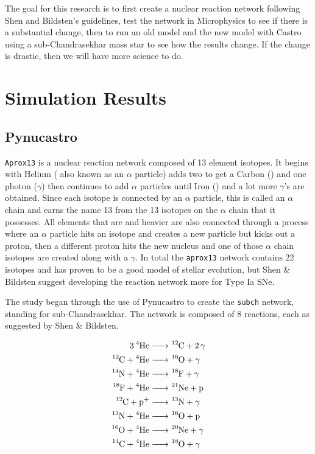\documentclass[11pt, oneside]{article}   	%
\begin{document}
  The goal for this research is to first create a nuclear reaction network following Shen and Bildsten's guidelines, test the network in Microphysics to see if there is a substantial change, then to run an old model and the new model with Castro using a sub-Chandrasekhar mass star to see how the results change. If the change is drastic, then we will have more science to do. 
  
\section{Simulation Results}

  \subsection{Pynucastro}
    
    {\tt Aprox13} is a nuclear reaction network composed of 13 element isotopes. It begins with Helium ( also known as an $\alpha$ particle) adds two  to get a Carbon () and one photon ($\gamma$) then continues to add $\alpha$ particles until Iron () and a lot more $\gamma$'s are obtained. Since each isotope is connected by an $\alpha$ particle, this is called an $\alpha$ chain and earns the name 13 from the 13 isotopes on the $\alpha$ chain that it possesses. All elements that are  and heavier are also connected through a process where an $\alpha$ particle hits an isotope and creates a new particle but kicks out a proton, then a different proton hits the new nucleus and one of those $\alpha$ chain isotopes are created along with a $\gamma$. In total the {\tt aprox13} network contains 22 isotopes and has proven to be a good model of stellar evolution, but Shen \& Bildsten suggest developing the reaction network more for Type Ia SNe. %
    
    The study began through the use of Pynucastro to create the {\tt subch} network, standing for sub-Chandrasekhar. The network is composed of 8 reactions, each as suggested by Shen \& Bildsten. %
    
    \begin{align}
            \ce{3 ^4He &->  ^{12}C + 2\gamma } \\ 
            \ce{^{12}C + ^4He &->  ^{16}O + \gamma } \\
            \ce{^{14}N + ^4He &->  ^{18}F + \gamma } \label{chemeq:1.1} \\
            \ce{^{18}F + ^4He &-> ^{21}Ne +  \text{p}} \label{chemeq:1.2} \\
            \ce{^{12}C + p+ &-> ^{13}N + \gamma } \label{chemeq:2.1} \\
            \ce{^{13}N + ^4He &-> ^{16}O + \text{p}} \label{chemeq:2.2} \\ 
            \ce{^{16}O + ^4He &-> ^{20}Ne + \gamma } \\
            \ce{^{14}C + ^4He &-> ^{18}O + \gamma } \label{chemeq:3.2}
    \end{align}
  
\end{document}
